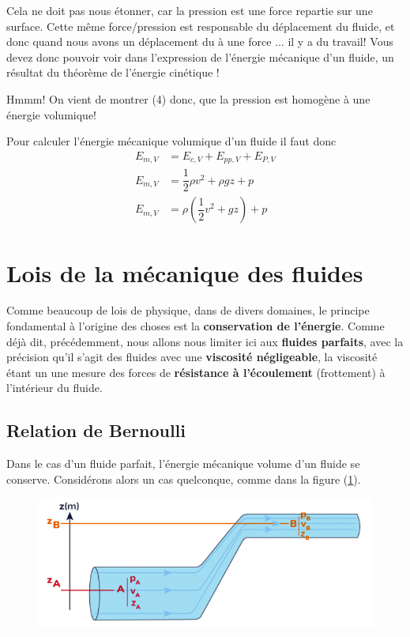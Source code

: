 \documentclass[11pt,a4paper]{article}
\begin{document}
\begingroup 
\setlength{\columnsep}{15pt}%
\setlength{\intextsep}{-10pt}%
\begin{table} 
\begin{rmrq} 
\small{Cela ne doit pas nous étonner, car la pression est une force repartie sur une surface. Cette même force/pression est responsable du déplacement du fluide, et donc quand nous avons un déplacement du à une force ... il y a du travail! Vous devez donc pouvoir voir dans l'expression de l'énergie mécanique d'un fluide, un résultat du théorème de l'énergie cinétique ! } 
\end{rmrq} 
\end{table} 

Hmmm! On vient de montrer (4) donc, que la pression est homogène à une énergie volumique! 

Pour calculer l'énergie mécanique volumique d'un fluide il faut donc 
\begin{align*}
    E_{m,V} &= E_{c,V} + E_{pp,V} + E_{P,V} \\
    E_{m,V} &=  \dfrac{1}{2}\rho v^2 + \rho g z + p \tag{5}\\
    E_{m,V} &=  \rho \left(\dfrac{1}{2}v^2 + g z \right) + p \tag{6}
\end{align*} 

\endgroup
\vspace{0.3cm}
\section{Lois de la mécanique des fluides}

Comme beaucoup de lois de physique, dans de divers domaines, le principe fondamental à l'origine des choses est la \textbf{conservation de l'énergie}. Comme déjà dit, précédemment, nous allons nous limiter ici aux \textbf{fluides parfaits}, avec la précision qu'il s'agit des fluides avec une \textbf{viscosité négligeable}, la viscosité étant un une mesure des forces de \textbf{résistance à l'écoulement} (frottement) à l'intérieur du fluide. 

\subsection{Relation de Bernoulli}
Dans le cas d'un fluide parfait, l'énergie mécanique volume d'un fluide se conserve. Considérons alors un cas quelconque, comme dans la figure (\ref{fig:bernoulli}). 

\begin{figure}[H]
    \centering
    \includegraphics[width=0.75\linewidth]{imgs/p9/bernoulli.jpg}
    \caption{}
    \label{fig:bernoulli}
\end{figure}
\end{document}
